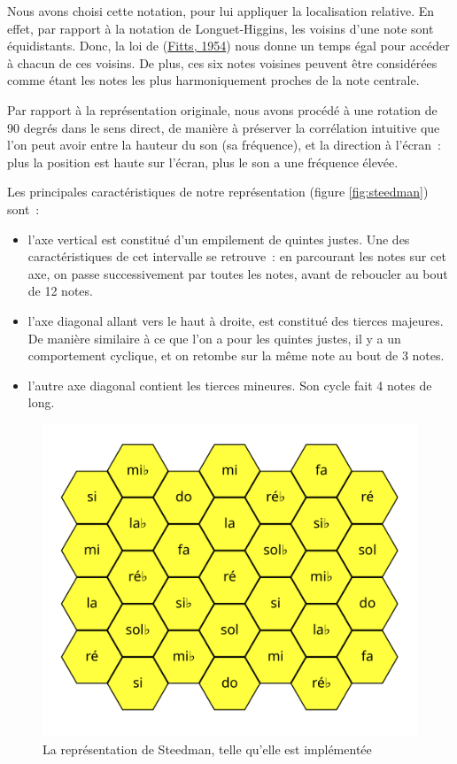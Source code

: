 \documentclass[
]{book}
\providecommand{\tightlist}{%
  \setlength{\itemsep}{0pt}\setlength{\parskip}{0pt}}
\begin{document}
Nous avons choisi cette notation, pour lui appliquer la localisation
relative. En effet, par rapport à la notation de Longuet-Higgins, les voisins
d'une note sont équidistants. Donc, la loi de (\protect\hyperlink{ref-fitts1954information}{Fitts, 1954}) nous
donne un temps égal pour accéder
à chacun de ces voisins. De plus, ces six notes voisines peuvent être
considérées comme étant les notes les plus harmoniquement proches de la note
centrale.

Par rapport à la représentation originale, nous avons procédé à une rotation
de 90 degrés dans le sens direct, de manière à préserver la corrélation
intuitive que l'on peut avoir entre la hauteur du son (sa fréquence), et la
direction à l'écran~: plus la position est haute sur l'écran, plus le son a
une fréquence élevée.

Les principales caractéristiques de notre représentation
(figure \ref{fig:steedman}) sont~:

\begin{itemize}
\tightlist
\item
  l'axe vertical est constitué d'un empilement de
  quintes justes. Une des caractéristiques de cet intervalle se retrouve~: en
  parcourant les notes sur cet axe, on passe successivement par toutes les
  notes, avant de reboucler au bout de 12 notes.
\item
  l'axe diagonal allant vers le haut à droite, est
  constitué des tierces majeures. De manière similaire à ce que l'on a pour
  les quintes justes, il y a un comportement cyclique, et on retombe sur la
  même note au bout de 3 notes.
\item
  l'autre axe diagonal contient les tierces mineures.
  Son cycle fait 4 notes de long.
\end{itemize}

\begin{figure}
\centering
\includegraphics{img/gamme.svg}
\caption{\label{fig:representation}La représentation de Steedman,
telle qu'elle est implémentée}
\end{figure}
\end{document}
